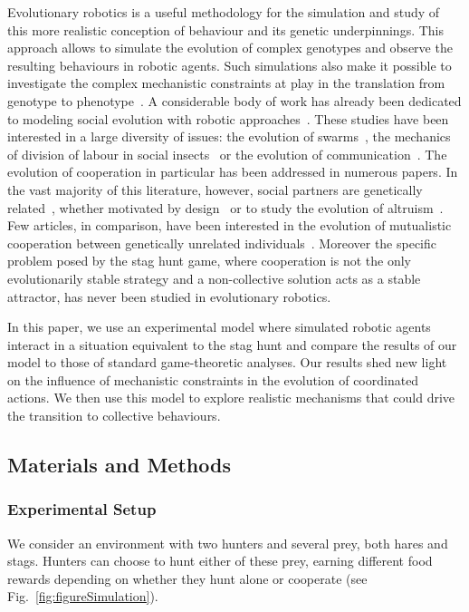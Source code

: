     Evolutionary robotics is a useful methodology for the simulation and study of this more realistic conception of behaviour and its genetic underpinnings\cite{Nolfi2004, Doncieux2015}. This approach allows to simulate the evolution of complex genotypes and observe the resulting behaviours in robotic agents. Such simulations also make it possible to investigate the complex mechanistic constraints at play in the translation from genotype to phenotype~\cite{Mitri2012}. A considerable body of work has already been dedicated to modeling social evolution with robotic approaches~\cite{Trianni2014}. These studies have been interested in a large diversity of issues: the evolution of swarms~\cite{Olson2013}, the mechanics of division of labour in social insects~\cite{Tarapore2010, Ferrante2015} or the evolution of communication~\cite{Floreano2007, Mitri2011, Wischmann2012, Solomon2012}. The evolution of cooperation in particular has been addressed in numerous papers. In the vast majority of this literature, however, social partners are genetically related~\cite{Waibel2009}, whether motivated by design~\cite{Hauert2010, Trianni2007} or to study the evolution of altruism~\cite{Waibel2011, Montanier2013}. Few articles, in comparison, have been interested in the evolution of mutualistic cooperation between genetically unrelated individuals~\cite{Solomon2012}. Moreover the specific problem posed by the stag hunt game, where cooperation is not the only evolutionarily stable strategy and a non-collective solution acts as a stable attractor, has never been studied in evolutionary robotics.

    In this paper, we use an experimental model where simulated robotic agents interact in a situation equivalent to the stag hunt and compare the results of our model to those of standard game-theoretic analyses. Our results shed new light on the influence of mechanistic constraints in the evolution of coordinated actions. We then use this model to explore realistic mechanisms that could drive the transition to collective behaviours.

  \subsection{Materials and Methods}
  \label{sec:methods}
    \subsubsection{Experimental Setup}
    \label{setup}
      We consider an environment with two hunters and several prey, both hares and stags. Hunters can choose to hunt either of these prey, earning different food rewards depending on whether they hunt alone or cooperate (see Fig.~\ref{fig:figureSimulation}).

